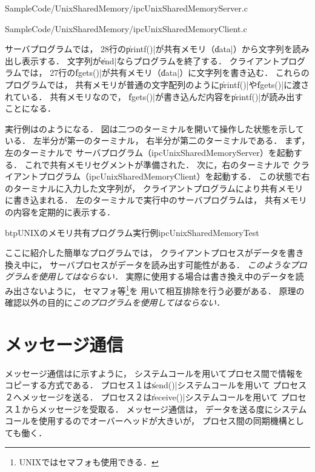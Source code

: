 
  {SampleCode/UnixSharedMemory/ipcUnixSharedMemoryServer.c}


  {SampleCode/UnixSharedMemory/ipcUnixSharedMemoryClient.c}

サーバプログラムでは，
28行の\|printf()|が共有メモリ（\|data|）から文字列を読み出し表示する．
文字列が\|end|ならプログラムを終了する．
クライアントプログラムでは，
27行の\|fgets()|が共有メモリ（\|data|）に文字列を書き込む．
これらのプログラムでは，
共有メモリが普通の文字配列のように\|printf()|や\|fgets()|に渡されている．
共有メモリなので，
\|fgets()|が書き込んだ内容を\|printf()|が読み出すことになる．

実行例はのようになる．
図は二つのターミナルを開いて操作した状態を示している．
左半分が第一のターミナル，
右半分が第二のターミナルである．
まず，左のターミナルで
サーバプログラム（ipcUnixSharedMemoryServer）を起動する．
これで共有メモリセグメントが準備された．
次に，右のターミナルで
クライアントプログラム（ipcUnixSharedMemoryClient）を起動する．
この状態で右のターミナルに入力した文字列が，
クライアントプログラムにより共有メモリに書き込まれる．
左のターミナルで実行中のサーバプログラムは，
共有メモリの内容を定期的に表示する．

\begin{myfig}{btp}{UNIXのメモリ共有プログラム実行例}{ipcUnixSharedMemoryTest}
  
\end{myfig}

ここに紹介した簡単なプログラムでは，
クライアントプロセスがデータを書き換え中に，
サーバプロセスがデータを読み出す可能性がある．
\emph{このようなプログラムを使用してはならない．}
実際に使用する場合は書き換え中のデータを読み出さないように，
セマフォ等\footnote{UNIXではセマフォも使用できる．}を
用いて相互排除を行う必要がある．
原理の確認以外の目的に\emph{このプログラムを使用してはならない．}

\section{メッセージ通信}
メッセージ通信はに示すように，
システムコールを用いてプロセス間で情報をコピーする方式である．
プロセス１は\|send()|システムコールを用いて
プロセス２へメッセージを送る．
プロセス２は\|receive()|システムコールを用いて
プロセス１からメッセージを受取る．
メッセージ通信は，
データを送る度にシステムコールを使用するのでオーバーヘッドが大きいが，
プロセス間の同期機構としても働く．

